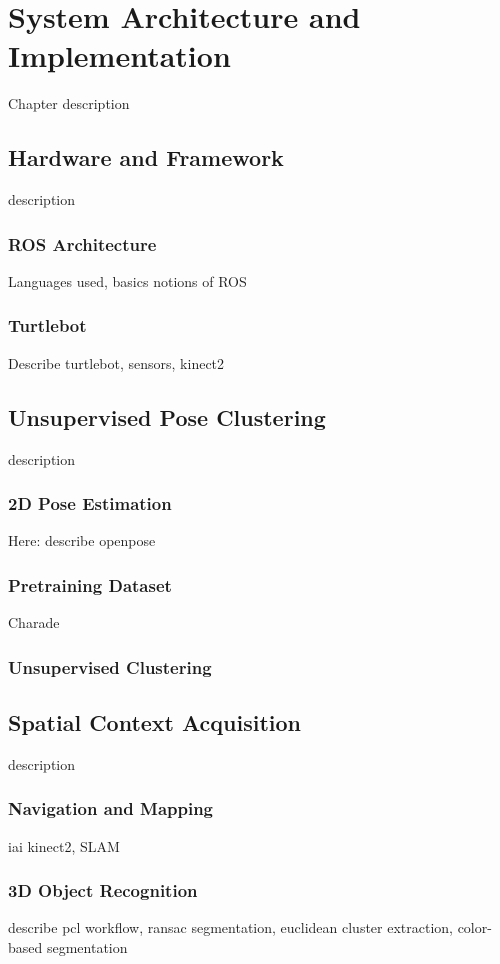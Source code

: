 \chapter{System Architecture and Implementation}
\label{chap:archi}

Chapter description
\section{Hardware and Framework}
description
\subsection{ROS Architecture}
Languages used, basics notions of ROS

\subsection{Turtlebot}
Describe turtlebot, sensors, kinect2

\section{Unsupervised Pose Clustering}
description
\subsection{2D Pose Estimation}
Here: describe openpose

\subsection{Pretraining Dataset}
Charade

\subsection{Unsupervised Clustering}

\section{Spatial Context Acquisition}
description

\subsection{Navigation and Mapping}
iai kinect2, SLAM

\subsection{3D Object Recognition}
describe pcl workflow, ransac segmentation, euclidean cluster extraction, color-based segmentation

